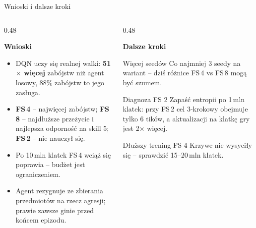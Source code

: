 \documentclass[aspectratio=169,10pt]{beamer}
\newcommand{\slidenum}{}
\begin{document}
\renewcommand{\slidenum}{12}
\begin{frame}{Wnioski i dalsze kroki}
  \begin{columns}[T,onlytextwidth]
    \begin{column}{0.48\textwidth}
      {\small\textbf{Wnioski}\par}\vspace{1mm}
      \footnotesize
      \begin{itemize}\setlength\itemsep{1.5mm}
        \item DQN uczy się realnej walki: \textbf{51$\times$ więcej} zabójstw niż agent losowy,
          88\% zabójstw to jego zasługa.
        \item \textbf{FS\,4} -- najwięcej zabójstw; \textbf{FS\,8} -- najdłuższe przeżycie
          i najlepsza odporność na skill 5; \textbf{FS\,2} -- nie nauczył się.
        \item Po 10\,mln klatek FS\,4 wciąż się poprawia -- budżet jest ograniczeniem.
        \item Agent rezygnuje ze zbierania przedmiotów na rzecz agresji;
          prawie zawsze ginie przed końcem epizodu.
      \end{itemize}
    \end{column}
    \begin{column}{0.48\textwidth}
      {\small\textbf{Dalsze kroki}\par}\vspace{1mm}
      \begin{infocard}{\faSeedling}{Więcej seedów}
        Co najmniej 3 seedy na wariant -- dziś różnice FS\,4 vs FS\,8 mogą być szumem.
      \end{infocard}
      \begin{infocard}{\faSearch}{Diagnoza FS 2}
        Zapaść entropii po 1\,mln klatek: przy FS\,2 cel 3-krokowy obejmuje tylko 6 tików,
        a aktualizacji na klatkę gry jest 2$\times$ więcej.
      \end{infocard}
      \begin{infocard}{\faForward}{Dłuższy trening FS 4}
        Krzywe nie wysyciły się -- sprawdzić 15--20\,mln klatek.
      \end{infocard}
    \end{column}
  \end{columns}
\end{frame}
\end{document}
